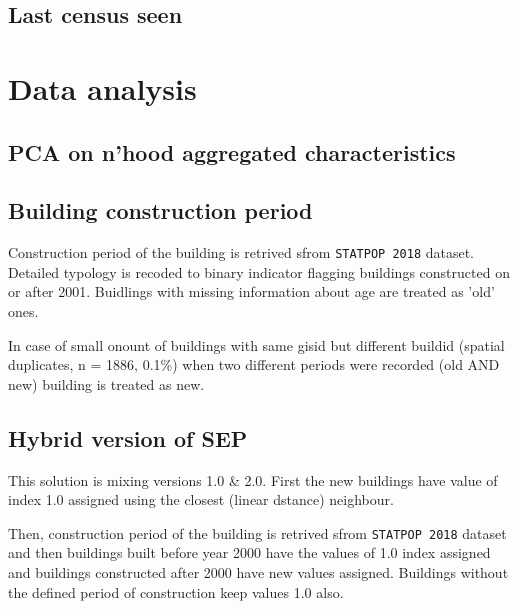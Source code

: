 \documentclass[a4paper, notitlepage, fleqn]{article} %
\begin{document}
\subsection{Last census seen}
\begin{stlog}\end{stlog}
\newpage
\section{Data analysis}
\subsection{PCA on n'hood aggregated characteristics}
\begin{stlog}\end{stlog}
\newpage
\subsection{Building construction period}

Construction period of the building is retrived sfrom \texttt{STATPOP 2018} dataset. Detailed typology is recoded to binary indicator flagging buildings constructed on or after 2001. Buidlings with missing information about age are treated as 'old' ones. 

In case of small onount of buildings with same gisid but different buildid 
(spatial duplicates, n = 1886, 0.1\%) 
when two different periods were recorded (old AND new) building is treated as new. 
\begin{stlog}\end{stlog}
\newpage
\subsection{Hybrid version of SEP}

This solution is mixing versions 1.0 \& 2.0. First the new buildings have value of index 1.0 assigned using the closest (linear dstance) neighbour. 

Then, construction period of the building is retrived sfrom \texttt{STATPOP 2018} dataset and then buildings built before year 2000 have the values of 1.0 index assigned and buildings constructed after 2000 have new values assigned. Buildings without the defined period of construction keep values 1.0 also. 
\end{document}
